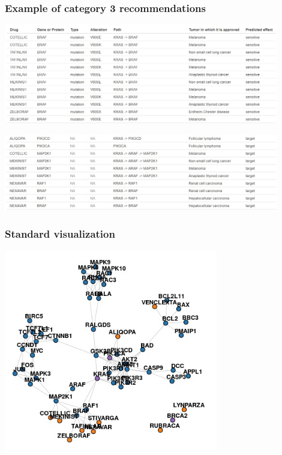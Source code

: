 \documentclass{beamer}
\begin{document}
\begin{frame}
\frametitle{Example of category 3 recommendations}

\includegraphics[width=0.90\textwidth, center]{Category_3_example.jpg}

\vspace{0.2cm}

\includegraphics[width=0.90\textwidth, center]{Category_3_example_target.jpg}

\end{frame}



\begin{frame}
\frametitle{Standard visualization}

\includegraphics[width=0.70\textwidth, center]{Visualization_standard.jpg}

\end{frame}
\end{document}

